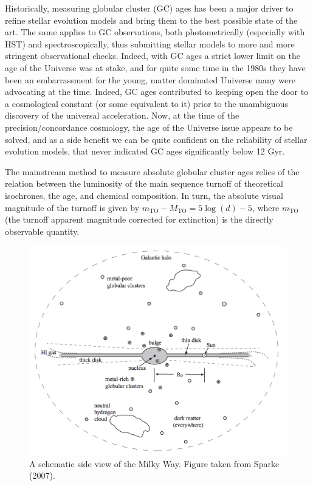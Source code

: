 \documentclass[a4paper,11pt]{article}
\begin{document}
{\noindent}Historically, measuring globular cluster (GC) ages has been a major driver to refine stellar evolution models and bring them to the best possible state of the art. The same applies to GC observations, both photometrically (especially with HST) and spectroscopically, thus submitting stellar models to more and more stringent observational checks. Indeed, with GC ages a strict lower limit on the age of the Universe was at stake, and for quite some time in the 1980s they have been an embarrassment for the young, matter dominated Universe many were advocating at the time. Indeed, GC ages contributed to keeping open the door to a cosmological constant (or some equivalent to it) prior to the unambiguous discovery of the universal acceleration. Now, at the time of the precision/concordance cosmology, the age of the Universe issue appears to be solved, and as a side benefit we can be quite confident on the reliability of stellar evolution models, that never indicated GC ages significantly below 12 Gyr.

{\noindent}The mainstream method to measure absolute globular cluster ages relies of the relation between the luminosity of the main sequence turnoff of theoretical isochrones, the age, and chemical composition. In turn, the absolute visual magnitude of the turnoff is given by $m_\mathrm{TO} - M_\mathrm{TO} = 5\log(d)-5$, where $m_\mathrm{TO}$ (the turnoff apparent magnitude corrected for extinction) is the directly observable quantity.

\begin{figure}[t!]
    \includegraphics[width=14cm]{figures/MWGschematic.png}
    \centering
    \caption{A schematic side view of the Milky Way. Figure taken from Sparke (2007).}
    \label{fig:mwgschematic}
\end{figure}
\end{document}
